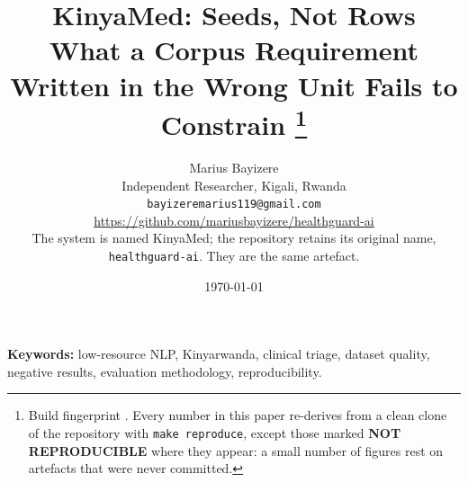 \documentclass[11pt]{article}
\title{\textbf{KinyaMed: Seeds, Not Rows}\\
\large What a Corpus Requirement Written in the Wrong Unit Fails to Constrain%
\thanks{Build fingerprint \texttt{\ResultFingerprint}. Every number in this paper
re-derives from a clean clone of the repository with \texttt{make reproduce},
except those marked \textbf{NOT REPRODUCIBLE} where they appear: a small number
of figures rest on artefacts that were never committed.}}
\author{Marius Bayizere\\
  Independent Researcher, Kigali, Rwanda\\
  \texttt{bayizeremarius119@gmail.com}\\
  \url{https://github.com/mariusbayizere/healthguard-ai}\\
  {\small The system is named KinyaMed; the repository retains its original
  name, \texttt{healthguard-ai}. They are the same artefact.}}
\date{\today}
\begin{document}
\maketitle



\begin{center}
\begin{minipage}{0.95\linewidth}
\small\textbf{Keywords:} low-resource NLP, Kinyarwanda, clinical triage, dataset
quality, negative results, evaluation methodology, reproducibility.
\end{minipage}
\end{center}

\vspace{1em}

















\appendix
\newcommand{\sectionprefix}{Appendix~}
\newcommand{\sectionsuffix}{:}

\end{document}
